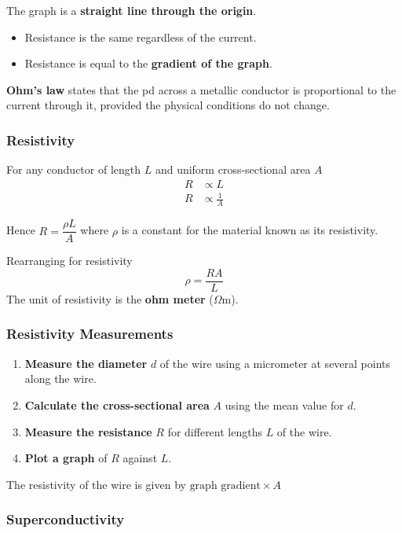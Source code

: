 The graph is a \textbf{straight line through the origin}.
\begin{itemize}
    \item Resistance is the same regardless of the current.
    \item Resistance is equal to the \textbf{gradient of the graph}.
\end{itemize}

\textbf{Ohm's law} states that the pd across a metallic conductor is proportional to the current through it, provided the physical conditions do not change.

\subsubsection*{Resistivity}

For any conductor of length $L$ and uniform cross-sectional area $A$
\begin{align*}
    R&\propto L\\
    R&\propto\frac{1}{A}
\end{align*}

Hence $R=\dfrac{\rho L}{A}$ where $\rho$ is a constant for the material known as its resistivity.

Rearranging for resistivity
$$\rho=\frac{RA}{L}$$
The unit of resistivity is the \textbf{ohm meter} ($\Omega$m).

\subsubsection*{Resistivity Measurements}
\begin{enumerate}
    \item \textbf{Measure the diameter} $d$ of the wire using a micrometer at several points along the wire.
    \item \textbf{Calculate the cross-sectional area} $A$ using the mean value for $d$.
    \item \textbf{Measure the resistance} $R$ for different lengths $L$ of the wire.
    \item \textbf{Plot a graph} of $R$ against $L$.
\end{enumerate}

The resistivity of the wire is given by $\text{graph gradient}\times A$

\subsubsection*{Superconductivity}

